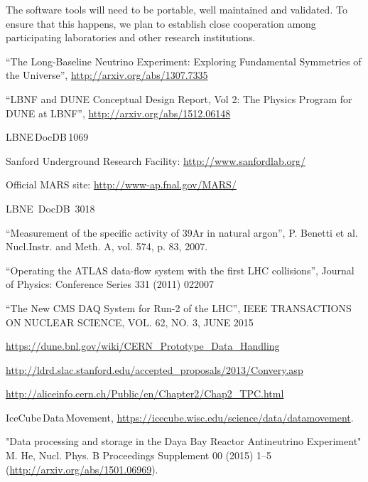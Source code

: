 \documentclass[12pt]{article}
\begin{document}
The software tools will need to be portable, well maintained and validated. To ensure that this happens,
we plan to establish close cooperation among participating laboratories and other research institutions.

\begin{thebibliography}{99}

 ``The Long-Baseline Neutrino Experiment: Exploring Fundamental Symmetries of the Universe'',  \url{http://arxiv.org/abs/1307.7335}

 ``LBNF and DUNE Conceptual Design Report, Vol 2: The Physics Program for DUNE at LBNF'', \url{http://arxiv.org/abs/1512.06148}

 LBNE\,DocDB\,1069  %

 Sanford Underground Research Facility: \url{http://www.sanfordlab.org/}

 Official MARS site: \url{http://www-ap.fnal.gov/MARS/}

 LBNE~DocDB~3018%

 ``Measurement of the specific activity of 39Ar in natural argon'', P. Benetti et al. Nucl.Instr. and Meth. A, vol. 574, p. 83, 2007.

 ``Operating the ATLAS data-flow system with the first LHC collisions'', Journal of Physics: Conference Series 331 (2011) 022007

 ``The New CMS DAQ System for Run-2 of the LHC'', IEEE TRANSACTIONS ON NUCLEAR SCIENCE, VOL. 62, NO. 3, JUNE 2015

 \url{https://dune.bnl.gov/wiki/CERN_Prototype_Data_Handling}

 \url{http://ldrd.slac.stanford.edu/accepted_proposals/2013/Convery.asp}

 \url{http://aliceinfo.cern.ch/Public/en/Chapter2/Chap2_TPC.html}

 IceCube\,Data\,Movement, \url{https://icecube.wisc.edu/science/data/datamovement}.

"Data processing and storage in the Daya Bay Reactor Antineutrino Experiment" M. He, Nucl. Phys. B Proceedings Supplement 00 (2015) 1–5 (\url{http://arxiv.org/abs/1501.06969}).


\end{thebibliography}
\end{document}
